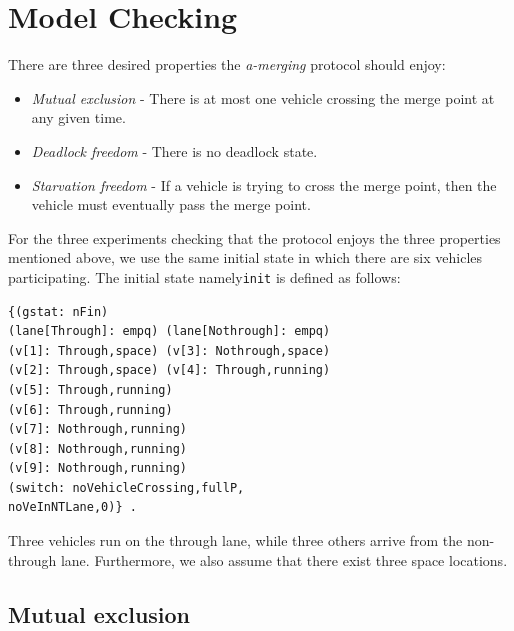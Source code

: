 \documentclass[10pt, conference, compsocconf]{IEEEtran}
\begin{document}
 
\section{Model Checking}
\label{sect_model}
There are three desired properties the \textit{a-merging} protocol should enjoy:
\begin{itemize}
    \item \textit{Mutual exclusion} - There is at most one vehicle crossing the merge point at any given time.
    \item \textit{Deadlock freedom} - There is no deadlock state.
    \item \textit{Starvation freedom} - If a vehicle is trying to cross the merge point, then the vehicle must eventually pass the merge point.
\end{itemize}


For the three experiments checking that the protocol enjoys the three properties mentioned above, we use the same initial state in which there are six vehicles participating. The initial state namely\verb!init! is defined as follows:
\begin{small}
\begin{verbatim}
{(gstat: nFin) 
(lane[Through]: empq) (lane[Nothrough]: empq) 
(v[1]: Through,space) (v[3]: Nothrough,space)
(v[2]: Through,space) (v[4]: Through,running)
(v[5]: Through,running) 
(v[6]: Through,running)
(v[7]: Nothrough,running) 
(v[8]: Nothrough,running)
(v[9]: Nothrough,running)
(switch: noVehicleCrossing,fullP,
noVeInNTLane,0)} .
\end{verbatim}
\end{small}

\noindent
Three vehicles run on the through lane, while three others arrive from the non-through lane.
Furthermore, we also assume that there exist three space locations.

\subsection{Mutual exclusion}
\end{document}
